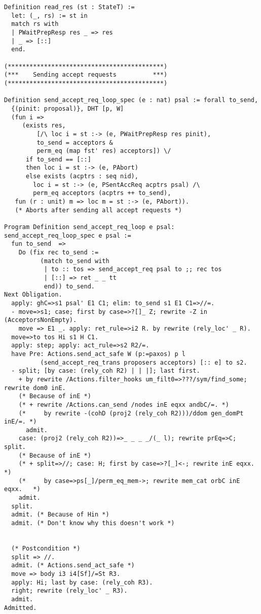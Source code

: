 \begin{landscape}
\begin{multicols*}{2}
\begin{lstlisting}[style=SourceCodeListing]
Definition read_res (st : StateT) :=
  let: (_, rs) := st in
  match rs with
  | PWaitPrepResp res _ => res
  | _ => [::]
  end.

(*******************************************)
(***    Sending accept requests          ***)
(*******************************************)

Definition send_accept_req_loop_spec (e : nat) psal := forall to_send,
  {(pinit: proposal)}, DHT [p, W]
  (fun i =>
     (exists res,
         [/\ loc i = st :-> (e, PWaitPrepResp res pinit),
         to_send = acceptors &
         perm_eq (map fst' res) acceptors]) \/
      if to_send == [::]
      then loc i = st :-> (e, PAbort)
      else exists (acptrs : seq nid),
        loc i = st :-> (e, PSentAccReq acptrs psal) /\
        perm_eq acceptors (acptrs ++ to_send),
   fun (r : unit) m => loc m = st :-> (e, PAbort)).
   (* Aborts after sending all accept requests *)

Program Definition send_accept_req_loop e psal: send_accept_req_loop_spec e psal :=
  fun to_send  =>
    Do (fix rec to_send :=
          (match to_send with
           | to :: tos => send_accept_req psal to ;; rec tos
           | [::] => ret _ _ tt
           end)) to_send.
Next Obligation.
  apply: ghC=>s1 psal' E1 C1; elim: to_send s1 E1 C1=>//=.
  - move=>s1; case; first by case=>?[]_ Z; rewrite -Z in (AcceptorsNonEmpty).
    move => E1 _. apply: ret_rule=>i2 R. by rewrite (rely_loc' _ R).
  move=>to tos Hi s1 H C1.
  apply: step; apply: act_rule=>s2 R2/=.
  have Pre: Actions.send_act_safe W (p:=paxos) p l
          (send_accept_req_trans proposers acceptors) [:: e] to s2.
  - split; [by case: (rely_coh R2) | | |]; last first.
    + by rewrite /Actions.filter_hooks um_filt0=>???/sym/find_some; rewrite dom0 inE.
    (* Because of inE *)
    (* + rewrite /Actions.can_send /nodes inE eqxx andbC/=. *)
    (*     by rewrite -(cohD (proj2 (rely_coh R2)))/ddom gen_domPt inE/=. *)
      admit.
    case: (proj2 (rely_coh R2))=>_ _ _ _/(_ l); rewrite prEq=>C; split.
    (* Because of inE *)
    (* + split=>//; case: H; first by case=>?[_]<-; rewrite inE eqxx. *)
    (*     by case=>ps[_]/perm_eq_mem->; rewrite mem_cat orbC inE eqxx.   *)
    admit.
  split.
  admit. (* Because of Hin *)
  admit. (* Don't know why this doesn't work *)


  (* Postcondition *)
  split => //.
  admit. (* Actions.send_act_safe *)
  move => body i3 i4[Sf]/=St R3.
  apply: Hi; last by case: (rely_coh R3).
  right; rewrite (rely_loc' _ R3).
  admit.
Admitted.


\end{lstlisting}
\end{multicols*}
\end{landscape}
